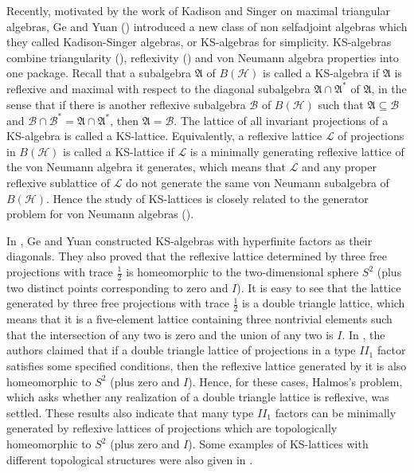 \documentclass[12pt]{article}
\newcommand{\AAA}{\mathfrak A} \newcommand{\TTT}{\mathfrak T}
\newcommand{\HHH}{\mathcal H} %
\newcommand{\LLL}{\mathcal L} %
\begin{document}
{Recently, motivated by the work of Kadison and Singer on maximal
triangular algebras, Ge and Yuan (\cite{GY1}) introduced a new class
of non selfadjoint algebras which they called Kadison-Singer
algebras, or KS-algebras for simplicity. KS-algebras combine
triangularity (\cite{KS}), reflexivity (\cite{Ha,Da}) and von
Neumann algebra properties into one package. Recall that a
subalgebra $\AAA$ of $B(\HHH)$ is called a KS-algebra if $\AAA$ is
reflexive and maximal with respect to the diagonal subalgebra $\AAA
\cap \AAA^*$ of $\AAA$, in the sense that if there is another
reflexive subalgebra $\mathcal{B}$ of $B(\HHH)$ such that $\AAA
\subseteq\mathcal{B}$ and $\mathcal{B}\cap\mathcal{B}^*=\AAA
\cap\AAA^*$, then $\AAA=\mathcal{B}$. The lattice of all invariant
projections of a KS-algebra is called a KS-lattice. Equivalently, a
reflexive lattice $\LLL$ of projections in $B(\HHH)$ is called a
KS-lattice if $\LLL$ is a minimally generating reflexive lattice of
the von Neumann algebra it generates, which means that $\LLL$ and
any proper reflexive sublattice of $\LLL$ do not generate the same
von Neumann subalgebra of $B(\HHH)$. Hence the study of KS-lattices
is closely related to the generator problem for von Neumann algebras
(\cite{GS}).




In \cite{GY1, GY2}, Ge and Yuan constructed KS-algebras with
hyperfinite factors as their diagonals. They also proved that the
reflexive lattice determined by three free projections with trace
$\frac12$ is homeomorphic to the two-dimensional sphere $S^2$ (plus
two distinct points corresponding to zero and $I$). It is easy to
see that the lattice generated by three free projections with trace
$\frac12$ is a double triangle lattice, which means that it is a
five-element lattice containing three nontrivial elements such that
the intersection of any two is zero and the union of any two is $I$.
In \cite{GY2}, the authors claimed that if a double triangle lattice
of projections in a type $II_1$ factor satisfies some specified
conditions, then the reflexive lattice generated by it is also
homeomorphic to $S^2$ (plus zero and $I$). Hence, for these cases,
Halmos's problem, which asks whether any realization of a double
triangle lattice is reflexive, was settled. These results also
indicate that many type $II_1$ factors can be minimally generated by
reflexive lattices of projections which are topologically
homeomorphic to $S^2$ (plus zero and $I$). Some examples of
KS-lattices with different topological structures were also given in
\cite{Hou, WY}.

}
\end{document}
